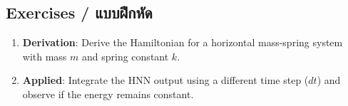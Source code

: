 \subsection{Exercises \quad / \quad \textthai{แบบฝึกหัด}}
\begin{enumerate}
    \item \textbf{Derivation}: Derive the Hamiltonian for a horizontal mass-spring system with mass $m$ and spring constant $k$.
    \item \textbf{Applied}: Integrate the HNN output using a different time step ($dt$) and observe if the energy remains constant.
\end{enumerate}

